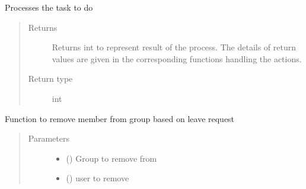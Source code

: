 \documentclass[letterpaper,10pt,english]{sphinxmanual}
\begin{document}
\begin{fulllineitems}
\begin{fulllineitems}
\label{\detokenize{Message:Message.Message.processTask}}
Processes the task to do
\begin{quote}\begin{description}
\item[{Returns}] \leavevmode
Returns int to represent result of the process. The details of return values are given in the corresponding functions handling the actions.

\item[{Return type}] \leavevmode
int

\end{description}\end{quote}

\end{fulllineitems}


\begin{fulllineitems}
\label{\detokenize{Message:Message.Message._handle_leave_group_request}}
Function to remove member from group based on leave request
\begin{quote}\begin{description}
\item[{Parameters}] \leavevmode\begin{itemize}
\item {} 
 () \textendash{} Group to remove from

\item {} 
 () \textendash{} user to remove

\end{itemize}

\end{description}\end{quote}

\end{fulllineitems}



\end{fulllineitems}
\end{document}
